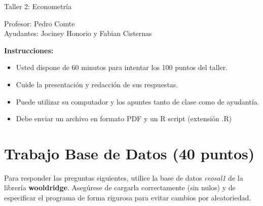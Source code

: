 \documentclass[letterpaper,11pt]{article}
\begin{document}
\begin{center}
    {\Large  Taller 2: Econometría }

Profesor:    Pedro Comte\\
Ayudantes: Jociney Honorio y Fabian Cisternas
\end{center}

\textbf{Instrucciones:} 

\begin{itemize}
    \item Usted dispone de 60 minutos  para intentar los 100 puntos del taller.
    \item Cuide la presentación y redacción de sus respuestas.
    \item Puede utilizar su computador y los apuntes tanto de clase como de ayudantía.
    \item Debe enviar un archivo en formato PDF y un R script (extensión .R)
\end{itemize}

\section{Trabajo Base de Datos (40 puntos)}

Para responder las preguntas siguientes, utilice la base de datos \textit{ceosal1} de la librería \textbf{wooldridge}. Asegúrese de cargarla correctamente (sin nulos) y de especificar el programa de forma rigurosa para evitar cambios por aleatoriedad.
\end{document}
